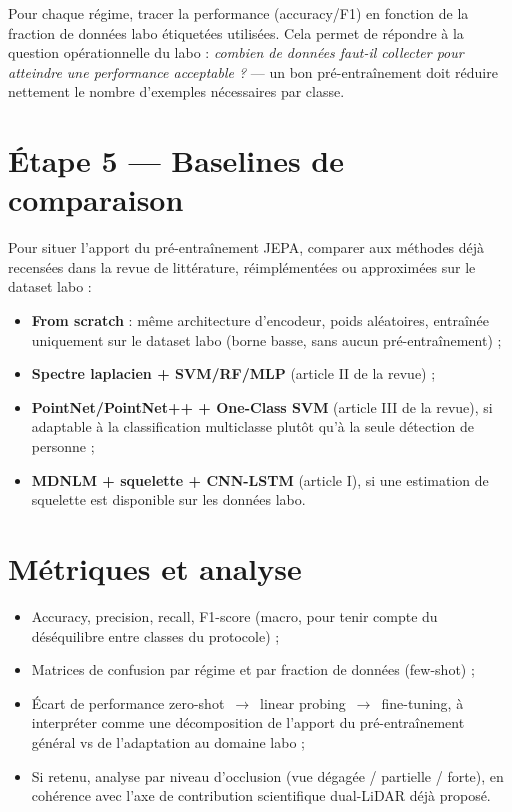 \documentclass[11pt]{article}
\begin{document}
Pour chaque régime, tracer la performance (accuracy/F1) en fonction de la fraction de données
labo étiquetées utilisées. Cela permet de répondre à la question opérationnelle du labo :
\emph{combien de données faut-il collecter pour atteindre une performance acceptable ?} --- un
bon pré-entraînement doit réduire nettement le nombre d'exemples nécessaires par classe.

\section{Étape 5 --- Baselines de comparaison}

Pour situer l'apport du pré-entraînement JEPA, comparer aux méthodes déjà recensées dans la
revue de littérature, réimplémentées ou approximées sur le dataset labo :
\begin{itemize}
    \item \textbf{From scratch} : même architecture d'encodeur, poids aléatoires, entraînée
    uniquement sur le dataset labo (borne basse, sans aucun pré-entraînement) ;
    \item \textbf{Spectre laplacien + SVM/RF/MLP} (article II de la revue) ;
    \item \textbf{PointNet/PointNet++ + One-Class SVM} (article III de la revue), si
    adaptable à la classification multiclasse plutôt qu'à la seule détection de personne ;
    \item \textbf{MDNLM + squelette + CNN-LSTM} (article I), si une estimation de squelette
    est disponible sur les données labo.
\end{itemize}

\section{Métriques et analyse}

\begin{itemize}
    \item Accuracy, precision, recall, F1-score (macro, pour tenir compte du déséquilibre
    entre classes du protocole) ;
    \item Matrices de confusion par régime et par fraction de données (few-shot) ;
    \item Écart de performance zero-shot~$\rightarrow$~linear probing~$\rightarrow$~fine-tuning,
    à interpréter comme une décomposition de l'apport du pré-entraînement général vs de
    l'adaptation au domaine labo ;
    \item Si retenu, analyse par niveau d'occlusion (vue dégagée / partielle / forte), en
    cohérence avec l'axe de contribution scientifique dual-LiDAR déjà proposé.
\end{itemize}
\end{document}
